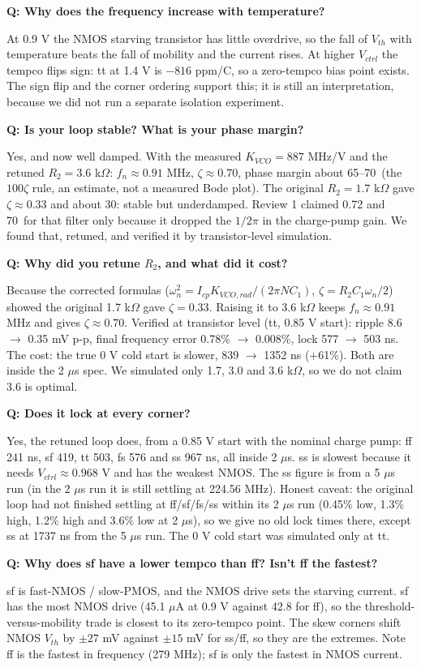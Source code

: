 \documentclass[11pt,a4paper]{article}
\newcommand{\qa}[2]{\par\smallskip\noindent\textbf{Q: #1}\par\noindent\hspace*{1em}\begin{minipage}[t]{\dimexpr\linewidth-1em}#2\end{minipage}\par}
\begin{document}
\qa{Why does the frequency increase with temperature?}{At 0.9 V the NMOS starving transistor has little overdrive, so the fall of $V_{th}$ with temperature beats the fall of mobility and the current rises. At higher $V_{ctrl}$ the tempco flips sign: tt at 1.4 V is $-816$ ppm/\textdegree C, so a zero-tempco bias point exists. The sign flip and the corner ordering support this; it is still an interpretation, because we did not run a separate isolation experiment.}

\qa{Is your loop stable? What is your phase margin?}{Yes, and now well damped. With the measured $K_{VCO}=887$ MHz/V and the retuned $R_2=3.6$ k$\Omega$: $f_n\approx0.91$ MHz, $\zeta\approx0.70$, phase margin about 65--70\textdegree\ (the $100\zeta$ rule, an estimate, not a measured Bode plot). The original $R_2=1.7$ k$\Omega$ gave $\zeta\approx0.33$ and about 30\textdegree: stable but underdamped. Review 1 claimed 0.72 and 70\textdegree\ for that filter only because it dropped the $1/2\pi$ in the charge-pump gain. We found that, retuned, and verified it by transistor-level simulation.}

\qa{Why did you retune $R_2$, and what did it cost?}{Because the corrected formulas ($\omega_n^2=I_{cp}K_{VCO,rad}/(2\pi NC_1)$, $\zeta=R_2C_1\omega_n/2$) showed the original 1.7 k$\Omega$ gave $\zeta=0.33$. Raising it to 3.6 k$\Omega$ keeps $f_n\approx0.91$ MHz and gives $\zeta\approx0.70$. Verified at transistor level (tt, 0.85 V start): ripple 8.6 $\to$ 0.35 mV p-p, final frequency error 0.78\% $\to$ 0.008\%, lock 577 $\to$ 503 ns. The cost: the true 0 V cold start is slower, 839 $\to$ 1352 ns (+61\%). Both are inside the 2 $\mu$s spec. We simulated only 1.7, 3.0 and 3.6 k$\Omega$, so we do not claim 3.6 is optimal.}

\qa{Does it lock at every corner?}{Yes, the retuned loop does, from a 0.85 V start with the nominal charge pump: ff 241 ns, sf 419, tt 503, fs 576 and ss 967 ns, all inside 2 $\mu$s. ss is slowest because it needs $V_{ctrl}\approx0.968$ V and has the weakest NMOS. The ss figure is from a 5 $\mu$s run (in the 2 $\mu$s run it is still settling at 224.56 MHz). Honest caveat: the original loop had not finished settling at ff/sf/fs/ss within its 2 $\mu$s run (0.45\% low, 1.3\% high, 1.2\% high and 3.6\% low at 2 $\mu$s), so we give no old lock times there, except ss at 1737 ns from the 5 $\mu$s run. The 0 V cold start was simulated only at tt.}

\qa{Why does sf have a lower tempco than ff? Isn't ff the fastest?}{sf is fast-NMOS / slow-PMOS, and the NMOS drive sets the starving current. sf has the most NMOS drive (45.1 $\mu$A at 0.9 V against 42.8 for ff), so the threshold-versus-mobility trade is closest to its zero-tempco point. The skew corners shift NMOS $V_{th}$ by $\pm27$ mV against $\pm15$ mV for ss/ff, so they are the extremes. Note ff is the fastest in frequency (279 MHz); sf is only the fastest in NMOS current.}
\end{document}

